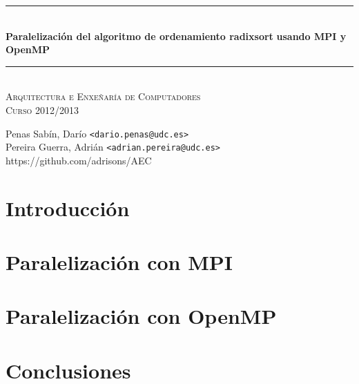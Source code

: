\documentclass[a4paper]{article}
\newcommand{\HRule}{\rule{\linewidth}{0.5mm}}
\begin{document}
		\begin{center}

			\HRule \\[0.4cm]
			{ \huge \bfseries Paralelización del algoritmo de ordenamiento radixsort}
      \vspace{0.2cm}
      { \huge \bfseries usando MPI y OpenMP}\\[0.4cm]
			\HRule \\[0cm]

			\vspace{1cm}
			\textsc{\Large Arquitectura e Enxeñaría de Computadores}\\[0.5cm]
			\textsc{\Large Curso 2012/2013}\\[0.5cm]

		\end{center}


		\vspace{2cm}

		\begin{center}
		Penas Sabín, Darío \texttt{<dario.penas@udc.es>}\\
		\vspace{0.1cm}
		Pereira Guerra, Adrián \texttt{<adrian.pereira@udc.es>}\\
    https://github.com/adrisons/AEC
		\end{center}
		\vspace{1cm}


\tableofcontents
\vspace{3cm}
\clearpage

\section{Introducción}
  	

\clearpage
\section{Paralelización con MPI}
	

\clearpage
\section{Paralelización con OpenMP}
	

\clearpage
\section{Conclusiones}
	
\end{document}

